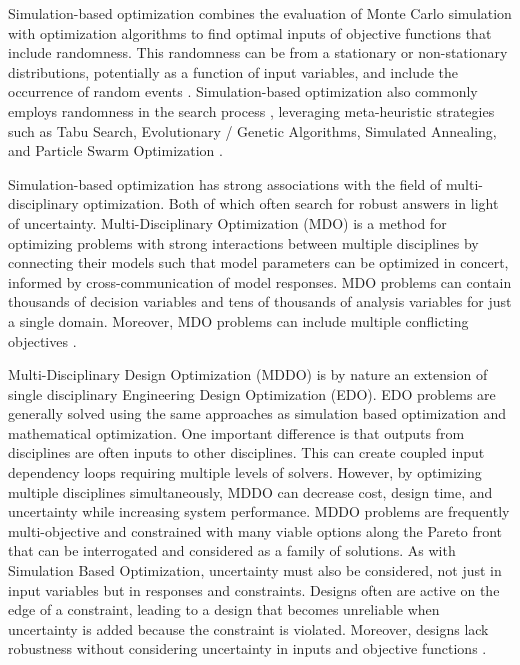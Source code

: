 \documentclass[a4paper]{article}
\begin{document}
Simulation-based optimization combines the evaluation of Monte Carlo simulation with optimization algorithms to find optimal inputs of objective functions that include randomness. This randomness can be from a stationary or non-stationary distributions, potentially as a function of input variables, and include the occurrence of random events \cite{floudas_encyclopedia_2009}. Simulation-based optimization also commonly employs randomness in the search process \cite{fu_handbook_2015}, leveraging meta-heuristic strategies such as Tabu Search, Evolutionary / Genetic Algorithms, Simulated Annealing, and Particle Swarm Optimization \cite{brandimarte_handbook_2014}.

Simulation-based optimization has strong associations with the field of multi-disciplinary optimization. Both of which often search for robust answers in light of uncertainty. Multi-Disciplinary Optimization (MDO) is a method for optimizing problems with strong interactions between multiple disciplines by connecting their models such that model parameters can be optimized in concert, informed by cross-communication of model responses. MDO problems can contain thousands of decision variables and tens of thousands of analysis variables for just a single domain. Moreover, MDO problems can include multiple conflicting objectives \cite{haftka_aiaa_nodate}.

Multi-Disciplinary Design Optimization (MDDO) is by nature an extension of single disciplinary Engineering Design Optimization (EDO). EDO problems are generally solved using the same approaches as simulation based optimization and mathematical optimization. One important difference is that outputs from disciplines are often inputs to other disciplines. This can create coupled input dependency loops requiring multiple levels of solvers. However, by optimizing multiple disciplines simultaneously, MDDO can decrease cost, design time, and uncertainty while increasing system performance. MDDO problems are frequently multi-objective and constrained with many viable options along the Pareto front that can be interrogated and considered as a family of solutions. As with Simulation Based Optimization, uncertainty must also be considered, not just in input variables but in responses and constraints. Designs often are active on the edge of a constraint, leading to a design that becomes unreliable when uncertainty is added because the constraint is violated. Moreover, designs lack robustness without considering uncertainty in inputs and objective functions \cite{martins_engineering_2021}.
\end{document}

